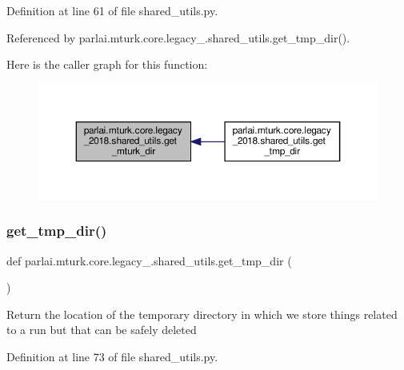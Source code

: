 Definition at line 61 of file shared\+\_\+utils.\+py.



Referenced by parlai.\+mturk.\+core.\+legacy\+\_.\+shared\+\_\+utils.\+get\+\_\+tmp\+\_\+dir().

Here is the caller graph for this function\+:
\nopagebreak
\begin{figure}[H]
\begin{center}
\leavevmode
\includegraphics[width=350pt]{namespaceparlai_1_1mturk_1_1core_1_1legacy__2018_1_1shared__utils_ad4874994d87b965b1bc462e1d55aadd3_icgraph}
\end{center}
\end{figure}
\mbox{\label{namespaceparlai_1_1mturk_1_1core_1_1legacy__2018_1_1shared__utils_a78e18954682e28ac24c8ebd529b1e5f8}} 
\subsubsection{\texorpdfstring{get\+\_\+tmp\+\_\+dir()}{get\_tmp\_dir()}}
{\footnotesize\ttfamily def parlai.\+mturk.\+core.\+legacy\+\_.\+shared\+\_\+utils.\+get\+\_\+tmp\+\_\+dir (\begin{DoxyParamCaption}{ }\end{DoxyParamCaption})}

\begin{DoxyVerb}Return the location of the temporary directory in which we store
things related to a run but that can be safely deleted
\end{DoxyVerb}
 

Definition at line 73 of file shared\+\_\+utils.\+py.



